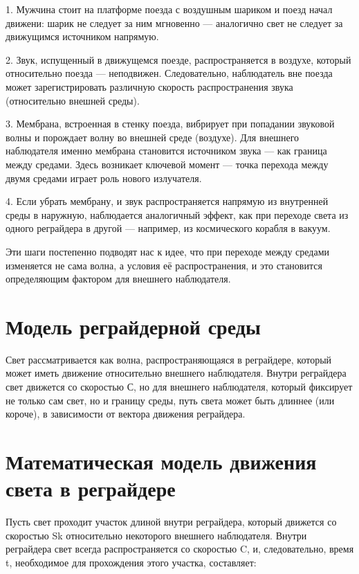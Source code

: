 \documentclass[12pt]{article}
\begin{document}
\par
1. Мужчина стоит на платформе поезда с воздушным шариком и поезд начал движени: шарик не следует за ним мгновенно — аналогично свет не следует за движущимся источником напрямую.
\par
2. Звук, испущенный в движущемся поезде, распространяется в воздухе, который относительно поезда — неподвижен. Следовательно, наблюдатель вне поезда может зарегистрировать различную скорость распространения звука (относительно внешней среды).
\par
3. Мембрана, встроенная в стенку поезда, вибрирует при попадании звуковой волны и порождает волну во внешней среде (воздухе). Для внешнего наблюдателя именно мембрана становится источником звука — как граница между средами. Здесь возникает ключевой момент — точка перехода между двумя средами играет роль нового излучателя.
\par
4. Если убрать мембрану, и звук распространяется напрямую из внутренней среды в наружную, наблюдается аналогичный эффект, как при переходе света из одного реграйдера в другой — например, из космического корабля в вакуум.
\par
Эти шаги постепенно подводят нас к идее, что при переходе между средами изменяется не сама волна, а условия её распространения, и это становится определяющим фактором для внешнего наблюдателя.


\section*{Модель реграйдерной среды}

Свет рассматривается как волна, распространяющаяся в реграйдере, который может иметь движение относительно внешнего наблюдателя. Внутри реграйдера свет движется со скоростью С, но для внешнего наблюдателя, который фиксирует не только сам свет, но и границу среды, путь света может быть длиннее (или короче), в зависимости от вектора движения реграйдера.

\section*{Математическая модель движения света в реграйдере}

Пусть свет проходит участок длиной \ell внутри реграйдера, который движется со скоростью Sk относительно некоторого внешнего наблюдателя. Внутри реграйдера свет всегда распространяется со скоростью C, и, следовательно, время t, необходимое для прохождения этого участка, составляет:
\end{document}
